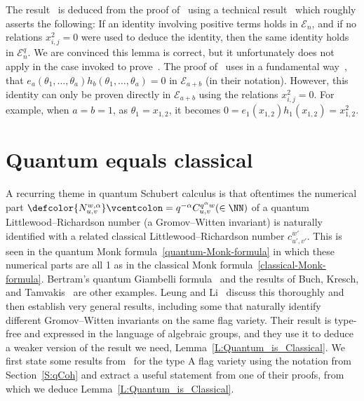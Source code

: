 The result~\cite[Thm.~15]{MPP} is deduced from the proof of~\cite[Thm.~8]{MPP} using a technical
result~\cite[Lem.~13]{MPP} which roughly asserts the following:
If an identity involving positive terms holds in ${\mathcal E}_n$, and if no relations  $x_{i,j}^2=0$ were used to deduce
the identity, then the same identity holds in ${\mathcal E}^q_n$.
We are convinced this lemma is correct, but it unfortunately does not apply in the case
invoked to prove~\cite[Thm.~15]{MPP}.
The proof of~\cite[Thm.~8]{MPP} uses in a fundamental way~\cite[Cor.~10]{MPP}, that
$e_a(\theta_1,\dotsc,\theta_a)h_b(\theta_1,\dotsc,\theta_a)=0$ in $\mathcal{E}_{a+b}$ (in their notation).
However, this identity can only be proven directly in  $\mathcal{E}_{a+b}$ using the relations $x_{i,j}^2=0$.
For example, when $a=b=1$, as $\theta_1=x_{1,2}$, it becomes $0=e_1(x_{1,2})h_1(x_{1,2})=x_{1,2}^2$.

\section{Quantum equals classical}
\label{quantum-equals-classical}

A recurring theme in quantum Schubert calculus is that oftentimes the numerical part
$\defcolor{N^{w,\alpha}_{u,v}}\vcentcolon=q^{-\alpha}C^{q^\alpha w}_{u,v}(\in\NN)$ of a quantum
Littlewood--Richardson number (a Gromov--Witten invariant)
is naturally identified with a related classical Littlewood--Richardson number $c^{w'}_{u',v'}$.
This is seen in the quantum Monk formula~\eqref{quantum-Monk-formula} in which these numerical parts are all 1 as in the
classical Monk formula~\eqref{classical-Monk-formula}.
Bertram's quantum Giambelli formula~\cite{Bertram} and the results of Buch, Kresch, and Tamvakis~\cite{BKT} are other
examples. 
Leung and Li~\cite{LeungLi2012} discuss this thoroughly and then establish very general results, including some that
naturally identify different Gromov--Witten invariants on the same flag variety. 
Their result is type-free and expressed in the language of algebraic groups, and they use it to deduce a 
weaker version of the result we need, Lemma~\ref{L:Quantum_is_Classical}.
We first state some results from~\cite{LeungLi2012} for the type A flag variety using the notation from Section~\ref{S:qCoh} and extract
a useful statement from one of their proofs, from which we deduce  Lemma~\ref{L:Quantum_is_Classical}.

